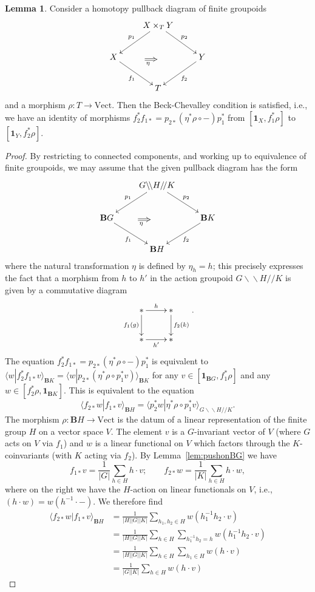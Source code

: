 \documentclass[12pt]{scrartcl}
\theoremstyle{definition}
\newtheorem{lemma}[definition]{Lemma}
\numberwithin{equation}{section}
\numberwithin{definition}{section}
\numberwithin{figure}{section}
\begin{document}
\begin{lemma}
\label{lem:BeckChevalley}
Consider a homotopy pullback diagram of finite groupoids
\[
\xymatrix{
& X\times_TY\ar[dl]_{p_1}\ar[dr]^{p_2}\\
X\ar[dr]_{f_1}&& Y\ar[dl]^{f_2}
\\& T
\ar@{=>}_{\eta\phantom{m}}(13,-14);(18,-14)
}
\]
and a morphism $\rho\colon T\to \mathrm{Vect}$.
Then the Beck-Chevalley condition is satisfied, i.e., we have an identity of morphisms $f_2^*f_{1*}=p_{2*}(\eta^*\rho\circ-)p_1^*$ from $[\mathbf{1}_X,f_1^*\rho]$ to $[\mathbf{1}_Y,f_2^*\rho]$.
\end{lemma}

\begin{proof}
By restricting to connected components, and working up to equivalence of finite groupoids, we may assume that the given pullback diagram has the form
\[
\xymatrix{
& G\backslash\!\backslash H/\!/K\ar[dl]_{p_1}\ar[dr]^{p_2}\\
\mathbf{B}G\ar[dr]_{f_1}&& \mathbf{B}K\ar[dl]^{f_2}
\\& \mathbf{B}H
\ar@{=>}_{\eta\phantom{m}}(13,-14);(18,-14)
}
\]
where the natural transformation $\eta$ is defined by $\eta_h=h$; this precisely expresses the fact that a morphism from $h$ to $h'$ in the action groupoid  $G\backslash\!\backslash H/\!/K$ is given by a commutative diagram
\[
\xymatrix{
\ast\ar[r]^{h}\ar[d]_{f_1(g)}&\ast\ar[d]^{f_2(k)}\\
\ast\ar[r]_{h'}&\ast
}.
\]
The equation $f_2^*f_{1*}=p_{2*}(\eta^*\rho\circ-)p_1^*$ is equivalent to $\langle w| f_2^*f_{1*}v\rangle_{\mathbf{B}K} = \langle w|p_{2*}(\eta^*\rho\circ p_1^*v)\rangle_{\mathbf{B}K}$ for any $v\in [\mathbf{1}_{\mathbf{B}G},f_1^*\rho]$ and any $w\in [f_2^*\rho,\mathbf{1}_{\mathbf{B}K}]$. This is equivalent to the equation
\[
\langle f_{2*}w| f_{1*}v\rangle_{\mathbf{B}H} = \langle p_2^*w|\eta^*\rho\circ p_1^*v\rangle_{G\backslash\!\backslash H/\!/K}.
\]
The morphism $\rho\colon \mathbf{B}H\to \mathrm{Vect}$ is the datum of a linear representation of the finite group $H$ on a vector space $V$. The element $v$ is a $G$-invariant vector of $V$ (where $G$ acts on $V$ via $f_1$) and $w$ is a linear functional on $V$ which factors through the $K$-coinvariants (with $K$ acting via $f_2$). 
By Lemma~\ref{lem:pushonBG} we have
\[
f_{1*}v=\frac{1}{|G|}\sum_{h\in H} h\cdot v;\qquad f_{2*}w=\frac{1}{|K|}\sum_{h\in H} h\cdot w,
\]
where on the right we have the $H$-action on linear functionals on $V$, i.e., $(h\cdot w)= w(h^{-1}\cdot -)$. We therefore find
\begin{align*}
\langle f_{2*}w| f_{1*}v\rangle_{\mathbf{B}H}&=\frac{1}{|H||G||K|}\sum_{h_1,h_2\in H}w(h_1^{-1}h_2\cdot v)\\
&=\frac{1}{|H||G||K|}\sum_{h\in H}\sum_{h_1^{-1}h_2=h}w(h_1^{-1}h_2\cdot v)\\
&=\frac{1}{|H||G||K|}\sum_{h\in H}\sum_{h_1\in H}w(h\cdot v)\\
&=\frac{1}{|G||K|}\sum_{h\in H}w(h\cdot v)
\end{align*}


\end{proof}
\end{document}
